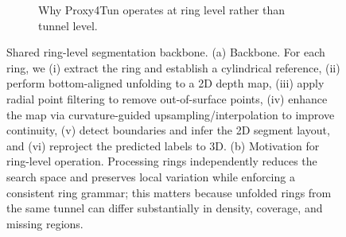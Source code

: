 \documentclass[a4paper,fleqn]{cas-dc}
\begin{document}
{\begin{figure}[t]
\begin{subfigure}{0.98\textwidth}
{%
}
\caption{Why Proxy4Tun operates at ring level rather than tunnel level.}
\end{subfigure}

\caption{
Shared ring-level segmentation backbone.
(a) Backbone. For each ring, we (i) extract the ring and establish a cylindrical reference, (ii) perform bottom-aligned unfolding to a 2D depth map, (iii) apply radial point filtering to remove out-of-surface points, (iv) enhance the map via curvature-guided upsampling/interpolation to improve continuity, (v) detect boundaries and infer the 2D segment layout, and (vi) reproject the predicted labels to 3D.
(b) Motivation for ring-level operation. Processing rings independently reduces the search space and preserves local variation while enforcing a consistent ring grammar; this matters because unfolded rings from the same tunnel can differ substantially in density, coverage, and missing regions.
}
\label{fig:ring_level_formulation_backbone}
\end{figure}


}
\end{document}
